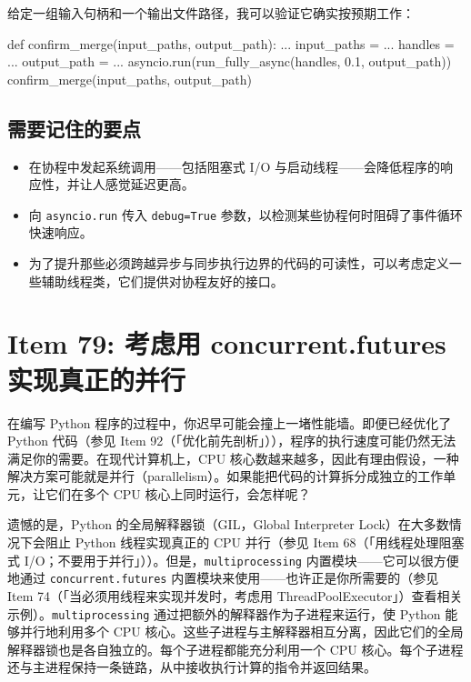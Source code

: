 给定一组输入句柄和一个输出文件路径，我可以验证它确实按预期工作：

\begin{codebox}[python]
def confirm_merge(input_paths, output_path):
    ...
input_paths = ...
handles = ...
output_path = ...
asyncio.run(run_fully_async(handles, 0.1, output_path))
confirm_merge(input_paths, output_path)
\end{codebox}

\subsection{需要记住的要点}

\begin{itemize}
\item 在协程中发起系统调用——包括阻塞式 I/O 与启动线程——会降低程序的响应性，并让人感觉延迟更高。
\item 向 \texttt{asyncio.run} 传入 \texttt{debug=True} 参数，以检测某些协程何时阻碍了事件循环快速响应。
\item 为了提升那些必须跨越异步与同步执行边界的代码的可读性，可以考虑定义一些辅助线程类，它们提供对协程友好的接口。
\end{itemize}

\section{Item 79: 考虑用 concurrent.futures 实现真正的并行}

在编写 Python 程序的过程中，你迟早可能会撞上一堵性能墙。即便已经优化了 Python 代码（参见 Item 92（「优化前先剖析」）），程序的执行速度可能仍然无法满足你的需要。在现代计算机上，CPU 核心数越来越多，因此有理由假设，一种解决方案可能就是并行（parallelism）。如果能把代码的计算拆分成独立的工作单元，让它们在多个 CPU 核心上同时运行，会怎样呢？

遗憾的是，Python 的全局解释器锁（GIL，Global Interpreter Lock）在大多数情况下会阻止 Python 线程实现真正的 CPU 并行（参见 Item 68（「用线程处理阻塞式 I/O；不要用于并行」））。但是，\texttt{multiprocessing} 内置模块——它可以很方便地通过 \texttt{concurrent.futures} 内置模块来使用——也许正是你所需要的（参见 Item 74（「当必须用线程来实现并发时，考虑用 ThreadPoolExecutor」）查看相关示例）。\texttt{multiprocessing} 通过把额外的解释器作为子进程来运行，使 Python 能够并行地利用多个 CPU 核心。这些子进程与主解释器相互分离，因此它们的全局解释器锁也是各自独立的。每个子进程都能充分利用一个 CPU 核心。每个子进程还与主进程保持一条链路，从中接收执行计算的指令并返回结果。

